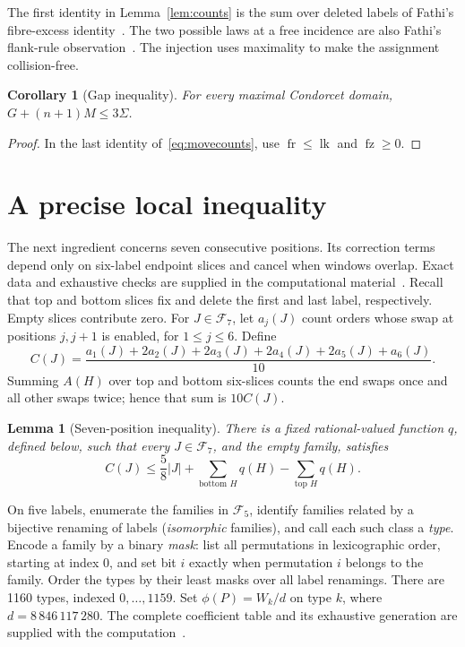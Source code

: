 \documentclass[11pt,letterpaper]{article}
\newtheorem{lemma}[theorem]{Lemma}
\newtheorem{corollary}[theorem]{Corollary}
\theoremstyle{definition}
\newcommand{\F}{\mathcal F}
\newcommand{\Sig}{\Sigma}
\newcommand{\fr}{\operatorname{fr}}
\newcommand{\fz}{\operatorname{fz}}
\newcommand{\lk}{\operatorname{lk}}
\begin{document}
The first identity in Lemma~\ref{lem:counts} is the sum over deleted
labels of Fathi's fibre-excess identity~\cite[eq.\ (96)]{Fathi}.
The two possible laws at a free incidence are also Fathi's flank-rule
observation~\cite[Lemma K.52]{Fathi}. The injection uses maximality
to make the assignment collision-free.

\begin{corollary}[Gap inequality]\label{cor:gap}
For every maximal Condorcet domain,
\(G+(n+1)M\leq3\Sig\).
\end{corollary}
\begin{proof}
In the last identity of~\eqref{eq:movecounts}, use
\(\fr\leq\lk\) and \(\fz\geq0\).
\end{proof}

\clearpage
\section{A precise local inequality}\label{sec:finite}
The next ingredient concerns seven consecutive positions. Its
correction terms depend only on six-label endpoint slices and cancel
when windows overlap. Exact data and exhaustive checks are supplied in
the computational material~\cite{LeanRepository}.
Recall that top and bottom slices fix and delete the first and last
label, respectively. Empty slices contribute zero.
For \(J\in\F_7\), let \(a_j(J)\) count orders whose swap at
positions \(j,j+1\) is enabled, for \(1\leq j\leq6\). Define
\begin{equation}\label{eq:cost}
 C(J)=\frac{a_1(J)+2a_2(J)+2a_3(J)+2a_4(J)+2a_5(J)+a_6(J)}{10}.
\end{equation}
Summing \(A(H)\) over top and bottom six-slices counts the end swaps
once and all other swaps twice; hence that sum is \(10C(J)\).

\begin{lemma}[Seven-position inequality]\label{lem:finite}
There is a fixed rational-valued function \(q\), defined below, such that
every \(J\in\F_7\), and the empty family, satisfies
\begin{equation}\label{eq:finite}
 C(J)\leq\frac58|J|+
   \sum_{\text{bottom }H}q(H)-\sum_{\text{top }H}q(H).
\end{equation}
\end{lemma}

On five labels, enumerate the families in \(\F_5\),
identify families related by a bijective renaming of labels
(\emph{isomorphic} families), and call each such class a \emph{type}. Encode a family by a binary \emph{mask}:
list all permutations in lexicographic order, starting at index 0,
and set bit \(i\) exactly when permutation \(i\) belongs to the family.
Order the types by their least masks over all label renamings.
There are 1160 types,
indexed \(0,\ldots,1159\). Set \(\phi(P)=W_k/d\) on type \(k\), where
\(d=8\,846\,117\,280\). The complete coefficient table and its
exhaustive generation are supplied with the computation~\cite{LeanRepository}.
\end{document}
